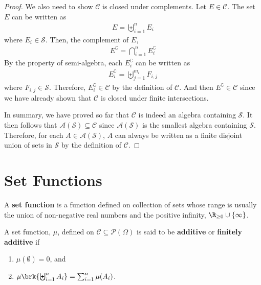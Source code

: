\documentclass[thmcnt=section, 12pt, color=purple]{my-elegantbook}
\begin{document}
\begin{proof}
	We also need to show $\mathcal{C}$ is closed under complements.
	Let $E \in \mathcal{C}$.
	The set $E$ can be written as 
	\begin{align*}
		E = \biguplus_{i=1}^n E_i
	\end{align*}
	where $E_i \in \mathcal{S}$.
	Then, the complement of $E$,
	\begin{align*}
		E^\complement = \bigcap_{i=1}^n E^\complement_i
	\end{align*}
	By the property of semi-algebra,
	each $E^\complement_i$ can be written as 
	\begin{align*}
		E^\complement_i = \biguplus_{j=1}^{m_i} F_{i,j}
	\end{align*}
	where $F_{i,j} \in \mathcal{S}$.
	Therefore, $E^\complement_i \in \mathcal{C}$ 
	by the definition of $\mathcal{C}$.
	And then $E^\complement \in \mathcal{C}$
	since we have already shown
	that $\mathcal{C}$ is closed under finite intersections.

	In summary, we have proved so far that $\mathcal{C}$
	is indeed an algebra containing $\mathcal{S}$.
	It then follows that $\mathcal{A}(\mathcal{S}) \subseteq \mathcal{C}$
	since $\mathcal{A}(\mathcal{S})$
	is the smallest algebra containing $\mathcal{S}$.
	Therefore, for each $A \in \mathcal{A}(\mathcal{S})$, $A$
	can always be written as a finite disjoint
	union of sets in $\mathcal{S}$
	by the definition of $\mathcal{C}$.
\end{proof}



\section{Set Functions}


A \textbf{set function}
is a function defined on collection of sets
whose range is usually the union
of non-negative real numbers 
and the positive infinity, $\R_{\geq 0} \cup \{\infty\}$.

\begin{definition} \label{def:5}
	A set function, $\mu$, defined 
	on $\mathcal{C} \subseteq \mathcal{P}(\Omega)$ is said to 
	be \textbf{additive}
	or \textbf{finitely additive}
	if
	\begin{enumerate}
		\item $\mu(\emptyset) = 0$, and
		\item $\mu \brk{ \biguplus_{i=1}^n A_i } = \sum_{i=1}^n \mu(A_i)$.
	\end{enumerate}
\end{definition}
\end{document}
